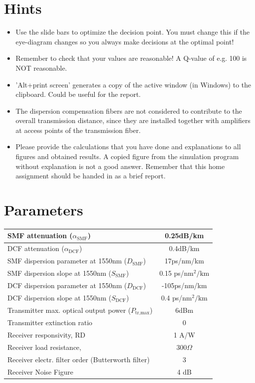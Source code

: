 \documentclass[10pt,letterpaper]{article}
\begin{document}
\section{Hints}
\begin{itemize}
\item
Use the slide bars to optimize the decision point. You must change this if the eye-diagram changes so you always make decisions at the optimal point!
\item
Remember to check that your values are reasonable! A Q-value of e.g. 100 is NOT reasonable.
\item
'Alt+print screen' generates a copy of the active window (in Windows) to the clipboard. Could be useful for the report.
\item
The dispersion compensation fibers are not considered to contribute to the overall transmission distance, since they are installed together with amplifiers at access points of the transmission fiber.
\item
Please provide the calculations that you have done and explanations to all figures and obtained results. A copied figure from the simulation program without explanation is not a good answer. Remember that this home assignment should be handed in as a brief report.
\end{itemize}
\section{Parameters}
\begin{table}[h]
\centering
\Large
\begin{tabular}{|l|c|}
\hline
SMF attenuation ($\alpha_\text{SMF}$)&0.25dB/km\\\hline
DCF attenuation ($\alpha_\text{DCF}$)&0.4dB/km\\\hline
SMF dispersion parameter at 1550nm ($D_\text{SMF}$)&17ps/nm/km\\\hline
SMF dispersion slope at 1550nm ($S_\text{SMF}$)&0.15 ps/$\text{nm}^2/\text{km}$\\\hline
DCF dispersion parameter at 1550nm ($D_\text{DCF}$)&-105ps/nm/km\\\hline
DCF dispersion slope at 1550nm ($S_\text{DCF}$)&0.4 ps/$\text{nm}^2/\text{km}$\\\hline
Transmitter max. optical output power ($P_{\text{tr},\text{max}}$)&6dBm\\\hline
Transmitter extinction ratio&0\\\hline
Receiver responsivity, RD&1 A/W\\\hline
Receiver load resistance,&$300\Omega$\\\hline
Receiver electr. filter order (Butterworth filter)&3\\\hline
Receiver Noise Figure&4 dB\\\hline
\end{tabular}
\end{table}
\end{document}
